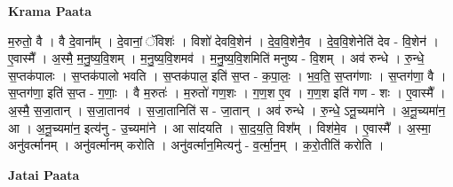 \documentclass[17pt]{extarticle}
\begin{document}
\textbf{Krama Paata} \newline

म॒रुतो॒ वै । वै दे॒वाना᳚म् । दे॒वानां॒ ॅविशः॑ । विशो॑ देववि॒शेन॑ । दे॒व॒वि॒शेनै॒व । दे॒व॒वि॒शेनेति॑ देव - वि॒शेन॑ । ए॒वास्मै᳚ । अ॒स्मै॒ म॒नु॒ष्य॒वि॒शम् । म॒नु॒ष्य॒वि॒शमव॑ । म॒नु॒ष्य॒वि॒शमिति॑ मनुष्य - वि॒शम् । अव॑ रुन्धे । रु॒न्धे॒ स॒प्तक॑पालः । स॒प्तक॑पालो भवति । स॒प्तक॑पाल॒ इति॑ स॒प्त - क॒पा॒लः॒ । भ॒व॒ति॒ स॒प्तग॑णाः । स॒प्तग॑णा॒ वै । स॒प्तग॑णा॒ इति॑ स॒प्त - ग॒णाः॒ । वै म॒रुतः॑ । म॒रुतो॑ गण॒शः । ग॒ण॒श ए॒व । ग॒ण॒श इति॑ गण - शः । ए॒वास्मै᳚ । अ॒स्मै॒ स॒जा॒तान् । स॒जा॒तानव॑ । स॒जा॒तानिति॑ स - जा॒तान् । अव॑ रुन्धे । रु॒न्धे॒ ऽनू॒च्यमा॑ने । अ॒नू॒च्यमा॑न॒ आ । अ॒नू॒च्यमा॑न॒ इत्य॑नु - उ॒च्यमा॑ने । आ सा॑दयति । सा॒द॒य॒ति॒ विश᳚म् । विश॑मे॒व । ए॒वास्मै᳚ । अ॒स्मा॒ अनु॑वर्त्मानम् । अनु॑वर्त्मानम् करोति । अनु॑वर्त्मान॒मित्यनु॑ - व॒र्त्मा॒न॒॒म् । क॒रो॒तीति॑ करोति । \newline

\textbf{Jatai Paata} \newline
\end{document}
